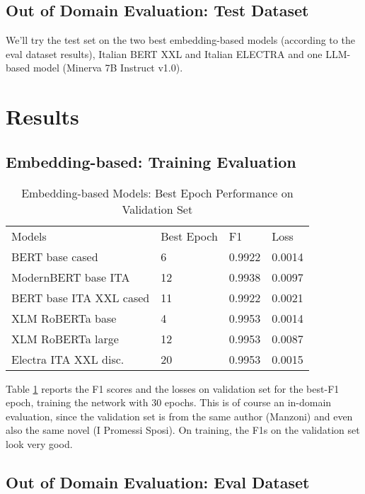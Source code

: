 \documentclass[11pt]{article}
\begin{document}
\subsection{Out of Domain Evaluation: Test Dataset}
We'll try the test set on the two best embedding-based models (according to the eval dataset results), Italian BERT XXL and Italian ELECTRA and one LLM-based model (Minerva 7B Instruct v1.0).

\section{Results}

\subsection{Embedding-based: Training Evaluation}
\begin{table}[]
	\small
	\caption{Embedding-based Models: Best Epoch Performance on Validation Set}
	\begin{tabular}{llll}
		Models & Best Epoch & F1 & Loss \\
		BERT base cased & 6      & 0.9922        & 0.0014                  \\
		ModernBERT base ITA  & 12      & 0.9938        & 0.0097                  \\
		BERT base ITA XXL cased & 11      & 0.9922        & 0.0021                 \\
		XLM RoBERTa base & 4       & 0.9953        & 0.0014                  \\
		XLM RoBERTa large & 12       & 0.9953       & 0.0087                 \\
		Electra ITA XXL disc. & 20       & 0.9953        & 0.0015                \\
	\end{tabular}
	\label{t1}
\end{table}
Table \ref{t1} reports the F1 scores and the losses on validation set for the best-F1 epoch, training the network with 30 epochs. \newline This is of course an in-domain evaluation, since the validation set is from the same author (Manzoni) and even also the same novel (I Promessi Sposi). \newline On training, the F1s on the validation set look very good.

\subsection{Out of Domain Evaluation: Eval Dataset}
\end{document}
